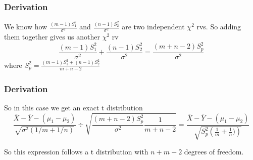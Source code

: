 \documentclass{beamer}
\begin{document}
\begin{frame}
\frametitle{Derivation}

We know how $\frac{(m-1)S_1^2}{\sigma^2}$ and $\frac{(n-1)S_2^2}{\sigma^2}$ are two independent $\chi^2$ rvs. So adding them together gives us another $\chi^2$ rv
\[
\frac{(m-1)S_1^2}{\sigma^2} + \frac{(n-1)S_2^2}{\sigma^2} = \frac{(m+n-2)S_p^2}{\sigma^2}
\]
where $S_p^2 = \frac{(m-1)S_1^2 + (n-1)S_2^2}{m+n-2}$


\end{frame}
\begin{frame}
\frametitle{Derivation}

So in this case we get an exact t distribution
\[
\frac{\bar{X} - \bar{Y} - (\mu_1 - \mu_2)}{\sqrt{\sigma^2(1/m + 1/n)}}\div \sqrt{ \frac{(m+n-2)S_p^2}{\sigma^2} \frac{1}{m+n-2}} = \frac{\bar{X} - \bar{Y} - (\mu_1 - \mu_2)}{\sqrt{S_p^2 \left(\frac{1}{m} + \frac{1}{n})\right)}}
\]

So this expression follows a t distribution with $n+m-2$ degrees of freedom.
\end{frame}
\end{document}
